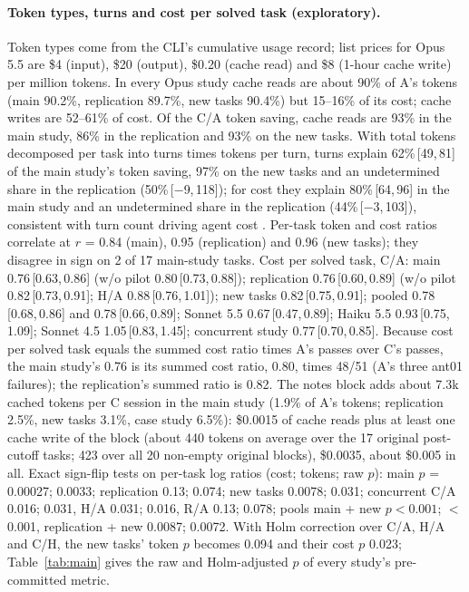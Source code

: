 \documentclass[11pt]{article}
\newcommand{\ci}[2]{\,[#1,\,#2]}
\begin{document}
\paragraph{Token types, turns and cost per solved task (exploratory).}
Token types come from the CLI's cumulative usage record; list prices for Opus 5.5 are \$4 (input), \$20 (output), \$0.20 (cache read) and \$8 (1-hour cache write) per million tokens.
In every Opus study cache reads are about 90\% of A's tokens (main 90.2\%, replication 89.7\%, new tasks 90.4\%) but 15--16\% of its cost; cache writes are 52--61\% of cost.
Of the C/A token saving, cache reads are 93\% in the main study, 86\% in the replication and 93\% on the new tasks.
With total tokens decomposed per task into turns times tokens per turn, turns explain 62\%\ci{49}{81} of the main study's token saving, 97\% on the new tasks and an undetermined share in the replication (50\%\ci{$-$9}{118}); for cost they explain 80\%\ci{64}{96} in the main study and an undetermined share in the replication (44\%\ci{$-$3}{103}), consistent with turn count driving agent cost \citep{kumar2026turncost}.
Per-task token and cost ratios correlate at $r$ = 0.84 (main), 0.95 (replication) and 0.96 (new tasks); they disagree in sign on 2 of 17 main-study tasks.
Cost per solved task, C/A: main 0.76\ci{0.63}{0.86} (w/o pilot 0.80\ci{0.73}{0.88}); replication 0.76\ci{0.60}{0.89} (w/o pilot 0.82\ci{0.73}{0.91}; H/A 0.88\ci{0.76}{1.01}); new tasks 0.82\ci{0.75}{0.91}; pooled 0.78\ci{0.68}{0.86} and 0.78\ci{0.66}{0.89}; Sonnet 5.5 0.67\ci{0.47}{0.89}; Haiku 5.5 0.93\ci{0.75}{1.09}; Sonnet 4.5 1.05\ci{0.83}{1.45}; concurrent study 0.77\ci{0.70}{0.85}.
Because cost per solved task equals the summed cost ratio times A's passes over C's passes, the main study's 0.76 is its summed cost ratio, 0.80, times 48/51 (A's three ant01 failures); the replication's summed ratio is 0.82.
The notes block adds about 7.3k cached tokens per C session in the main study (1.9\% of A's tokens; replication 2.5\%, new tasks 3.1\%, case study 6.5\%): \$0.0015 of cache reads plus at least one cache write of the block (about 440 tokens on average over the 17 original post-cutoff tasks; 423 over all 20 non-empty original blocks), \$0.0035, about \$0.005 in all.
Exact sign-flip tests on per-task log ratios (cost; tokens; raw $p$): main $p$ = 0.00027; 0.0033; replication 0.13; 0.074; new tasks 0.0078; 0.031; concurrent C/A 0.016; 0.031, H/A 0.031; 0.016, R/A 0.13; 0.078; pools main + new $p<0.001$; $<$0.001, replication + new 0.0087; 0.0072. With Holm correction over C/A, H/A and C/H, the new tasks' token $p$ becomes 0.094 and their cost $p$ 0.023; Table~\ref{tab:main} gives the raw and Holm-adjusted $p$ of every study's pre-committed metric.
\end{document}
